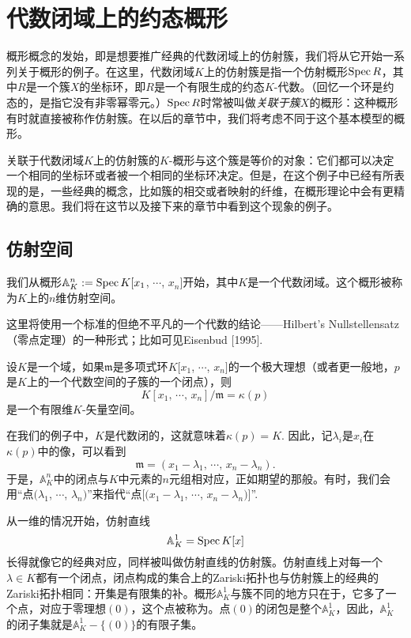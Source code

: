 \section{代数闭域上的约态概形}

概形概念的发始，即是想要推广经典的代数闭域上的仿射簇，我们将从它开始一系列关于概形的例子。在这里，代数闭域$K$上的仿射簇是指一个仿射概形$\operatorname{Spec} R$，其中$R$是一个簇$X$的坐标环，即$R$是一个有限生成的约态$K$-代数。（回忆一个环是约态的，是指它没有非零幂零元。）$\operatorname{Spec} R$时常被叫做\textit{关联于簇$X$}的概形：这种概形有时就直接被称作仿射簇。在以后的章节中，我们将考虑不同于这个基本模型的概形。

关联于代数闭域$K$上的仿射簇的$K$-概形与这个簇是等价的对象：它们都可以决定一个相同的坐标环或者被一个相同的坐标环决定。但是，在这个例子中已经有所表现的是，一些经典的概念，比如簇的相交或者映射的纤维，在概形理论中会有更精确的意思。我们将在这节以及接下来的章节中看到这个现象的例子。

\subsection{仿射空间}

我们从概形$\mathbb{A}^n_K:=\operatorname{Spec} K[x_1$, $\cdots$, $x_n]$开始，其中$K$是一个代数闭域。这个概形被称为$K$上的$n$维仿射空间。

这里将使用一个标准的但绝不平凡的一个代数的结论------Hilbert's Nullstellensatz（零点定理）的一种形式；比如可见Eisenbud [1995].

\begin{thm}[Nullstellensatz]
	设$K$是一个域，如果$\mathfrak{m}$是多项式环$K[x_1$, $\cdots$, $x_n]$的一个极大理想（或者更一般地，$p$是$K$上的一个代数空间的子簇的一个闭点），则
	\[
		K[x_1\text{, }\cdots\text{, }x_n]/\mathfrak{m}=\kappa(p)
	\]
	是一个有限维$K$-矢量空间。
\end{thm}

在我们的例子中，$K$是代数闭的，这就意味着$\kappa(p)=K$. 因此，记$\lambda_i$是$x_i$在$\kappa(p)$中的像，可以看到
\[
	\mathfrak{m}=(x_1-\lambda_1\text{, }\cdots\text{, }x_n-\lambda_n).
\]
于是，$\mathbb{A}^n_K$中的闭点与$K$中元素的$n$元组相对应，正如期望的那般。有时，我们会用“点$(\lambda_1$, $\cdots$, $\lambda_n)$”来指代“点$[(x_1-\lambda_1$, $\cdots$, $x_n-\lambda_n)]$”. 

从一维的情况开始，仿射直线
\[
	\mathbb{A}^1_K=\operatorname{Spec} K[x]
\]
长得就像它的经典对应，同样被叫做仿射直线的仿射簇。仿射直线上对每一个$\lambda\in K$都有一个闭点，闭点构成的集合上的Zariski拓扑也与仿射簇上的经典的Zariski拓扑相同：开集是有限集的补。概形$\mathbb{A}^1_K$与簇不同的地方只在于，它多了一个点，对应于零理想$(0)$，这个点被称为。点$(0)$的闭包是整个$\mathbb{A}^1_K$，因此，$\mathbb{A}^1_K$的闭子集就是$\mathbb{A}^1_K-\{(0)\}$的有限子集。

